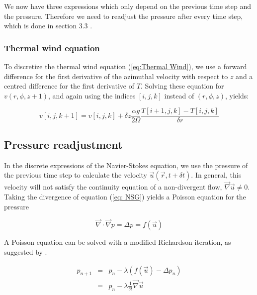 \documentclass[12pt, a4paper]{article} %
\begin{document}
			We now have three expressions which only depend on the previous time step and the pressure. Therefore we need to readjust the pressure after every time step, which is done in section 3.3 .
			
		\subsubsection{Thermal wind equation}
			To discretize the thermal wind equation (\ref{eq:Thermal Wind}), we use a forward difference for the first derivative of the azimuthal velocity with respect to $z$ and a centred difference for the first derivative of $T$. Solving these equation for $v(r,\phi, z+1)$, and again using the indices $[i,j,k]$ instead of $(r,\phi,z)$, yields:
			
			\begin{equation}
			v[i,j,k+1] = v[i,j,k] + \delta z \frac{\alpha g}{2\Omega} \frac{T[i+1,j,k]-T[i,j,k]}{\delta r}
				\label{eq:Discrete Thermal v}
			\end{equation}
		
			
	\subsection{Pressure readjustment} %
		In the discrete expressions of the Navier-Stokes equation, we use the pressure of the previous time step to calculate the velocity $\vec{u}(\vec{r},t+\delta t)$. In general, this velocity will not satisfy the continuity equation of a non-divergent flow, $\vec{\nabla} \vec{u} \neq 0$. Taking the divergence of equation (\ref{eq: NSG}) yields a Poisson equation for the pressure
		
		\begin{equation}
			\vec{\nabla} \cdot \vec{\nabla} p = \Delta p = f(\vec{u})
			\label{eq:Poisson Pressure}
		\end{equation}
		
		A Poisson equation can be solved with a modified Richardson iteration, as suggested by \cite{Schmittfull2005}. %
		
		\begin{eqnarray}
			p_{n+1} &=& p_n - \lambda \left(f(\vec{u}) - \Delta p_n\right)
			\nonumber \\
			&=& p_n - \lambda \frac{1}{\delta t} \vec{\nabla}\vec{u}
			\label{eq:Drucknachregelung p}
		\end{eqnarray}
		
\end{document}
